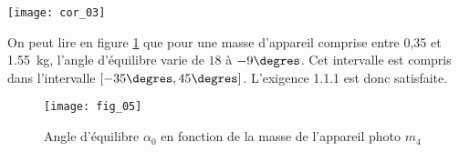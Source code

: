 \ifprof
\begin{marginfigure}
\texttt{[image: cor\_03]}
\end{marginfigure}
\begin{corrige} 

On peut lire en figure \ref{Cy_11_Ch_03_PFS_2D_TD_05_fig_05} que pour une masse d'appareil comprise entre 0,35 et \SI{1,55}{kg}, l'angle d'équilibre varie de $18$ à $-9\degres$. Cet intervalle est compris dans l'intervalle $\left[-35\degres,45\degres\right]$. L'exigence 1.1.1 est donc satisfaite.
\end{corrige}
\else
\fi


\begin{figure}[!h]
\texttt{[image: fig\_05]}
\caption{Angle d’équilibre $\alpha_0$ en fonction de la masse de l’appareil photo $m_4$}
\label{Cy_11_Ch_03_PFS_2D_TD_05_fig_05}
\end{figure}